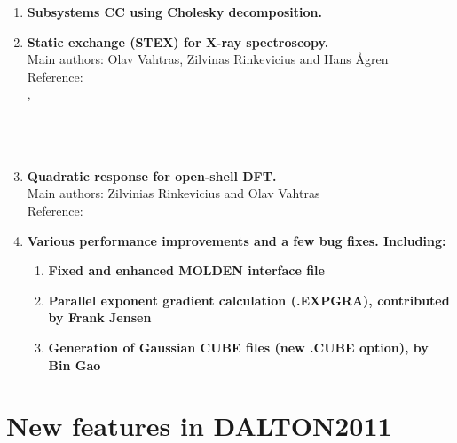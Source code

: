 \begin{enumerate}
\item{\bf  Subsystems CC using Cholesky decomposition.}
\item{\bf  Static exchange (STEX) for X-ray spectroscopy.} \\
Main authors: Olav Vahtras, Zilvinas Rinkevicius and Hans {\AA}gren\\
Reference:\\
\cite{niskanencppc13},\\
\cite{luopra97}\\
\cite{vahtrasjpb97}\\
\cite{agrencpl94}\\
\item{\bf  Quadratic response for open-shell DFT.}\\
Main authors: Zilvinias Rinkevicius and Olav Vahtras\\
Reference:\\
 \cite{rinkeviciusjctc08}
\item{\bf  Various performance improvements and a few bug fixes. Including:}
\begin{enumerate}
   \item{\bf  Fixed and enhanced MOLDEN interface file}
   \item{\bf  Parallel exponent gradient calculation (.EXPGRA), contributed by Frank Jensen}
   \item{\bf  Generation of Gaussian CUBE files (new .CUBE option), by Bin Gao}
\end{enumerate}
\end{enumerate}

\section{New features in DALTON2011}

